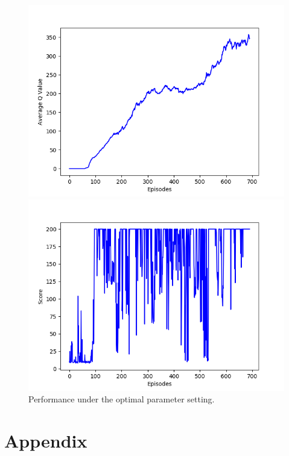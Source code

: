 \documentclass{article}
\begin{document}
\begin{figure}[H]
  \centering
  \begin{minipage}{0.49\textwidth}
    \centering
    \includegraphics[scale=0.45]{../experiments/final/qvalues.png}
  \end{minipage}
  \begin{minipage}{0.49\textwidth}
    \centering
    \includegraphics[scale=0.45]{../experiments/final/scores.png}
  \end{minipage}
  \caption{Performance under the optimal parameter setting.}
  \label{final}
\end{figure}

\pagebreak
\appendix
\section{Appendix}




\end{document}
